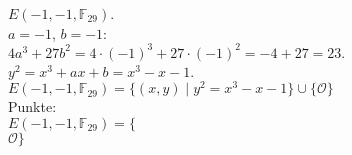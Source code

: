 \documentclass[a4paper, 10pt]{scrartcl}
\begin{document}
$E(-1, -1, \mathbb{F}_{29})$.\\

$a = -1$, $b = -1$:\\
$4a^{3} + 27b^{2} = 4\cdot (-1)^{3} + 27\cdot (-1)^{2} = -4 + 27 = 23.$\\
$y^{2} = x^{3} + ax + b = x^{3} - x - 1$.\\

$E(-1, -1, \mathbb{F}_{29}) = \{ (x, y)\mid y^{2} = x^{3} - x - 1\}\cup \{ \mathcal{O} \}$\\

Punkte:\\
$
E(-1, -1, \mathbb{F}_{29}) = \{
$\\
$
$\\
$
$\\
$
$\\
$
$\\
$
\mathcal{O} \}
$\\
\end{document}
